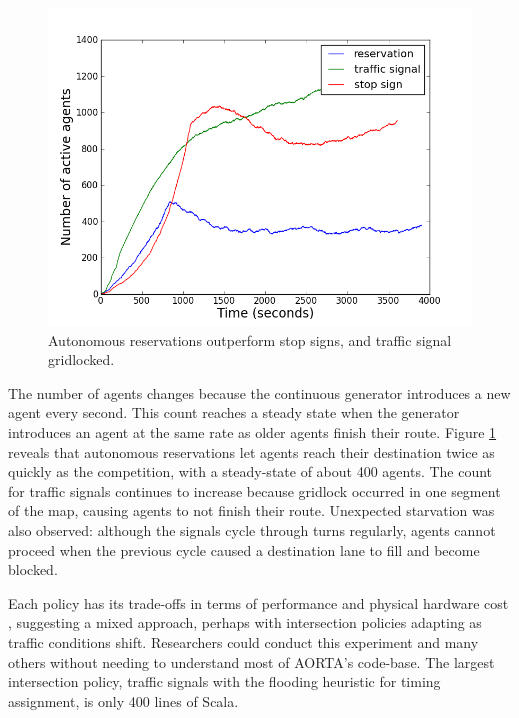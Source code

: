 \documentclass[letterpaper, 10 pt, conference]{ieeeconf}  %
\begin{document}
\begin{figure}[h]
  \centering \includegraphics[width=\linewidth]{agent_cnt_atx.png}
  \caption{Autonomous reservations outperform stop signs, and traffic signal
           gridlocked.}
  \label{fig:agent_cnt}
  \vspace{-10pt}
\end{figure}

The number of agents changes because the continuous generator introduces a new
agent every second. This count reaches a steady state when the generator
introduces an agent at the same rate as older agents finish their route. Figure
\ref{fig:agent_cnt} reveals that autonomous reservations let agents reach their
destination twice as quickly as the competition, with a steady-state of about
400 agents. The count for traffic signals continues to increase because gridlock
occurred in one segment of the map, causing agents to not finish their route.
Unexpected starvation was also observed: although the signals cycle through
turns regularly, agents cannot proceed when the previous cycle caused a
destination lane to fill and become blocked.

Each policy has its trade-offs in terms of performance and physical hardware
cost , suggesting a mixed approach,
perhaps with intersection policies adapting as traffic conditions shift.
Researchers could conduct this experiment and many others without needing to
understand most of AORTA's code-base. The largest intersection policy, traffic
signals with the flooding heuristic for timing assignment, is only 400 lines of
Scala.
\end{document}
